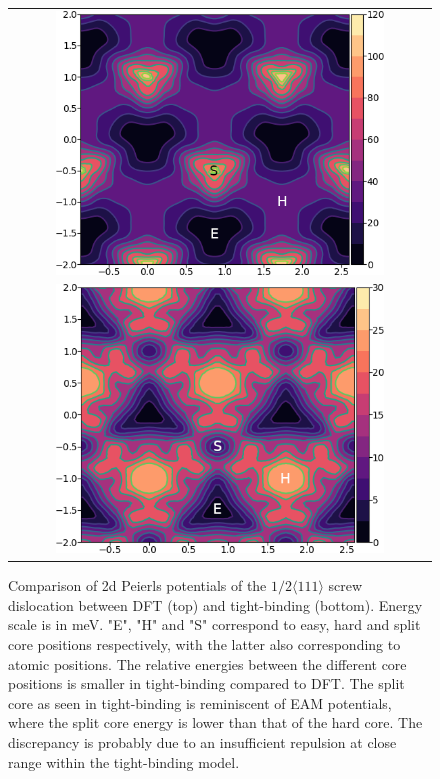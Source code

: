 \documentclass[a4paper,11pt]{article}
\begin{document}
        \begin{figure}
    \begin{tabular}{c}
	     \includegraphics[width=0.8\textwidth]{Images/itakura_dislocation_energy_landscape_2_labelled.png} \\
             \includegraphics[width=0.8\textwidth]{Images/tbe_dislocation_energy_landscape_pure_labelled.png}  \\
    \end{tabular}		
\caption{Comparison of 2d Peierls potentials of the $1/2\langle 111\rangle$ screw dislocation between DFT \cite{Itakura2012} (top) and tight-binding (bottom). Energy scale is in meV. "E", "H" and "S" correspond to easy, hard and split core positions respectively, with the latter also corresponding to atomic positions. The relative energies between the different core positions is smaller in tight-binding compared to DFT. The split core as seen in tight-binding is reminiscent of EAM potentials, where the split core energy is lower than that of the hard core. The discrepancy is probably due to an insufficient repulsion at close range within the tight-binding model.}
	\label{fig:peierlspot}
    \end{figure}
\end{document}
